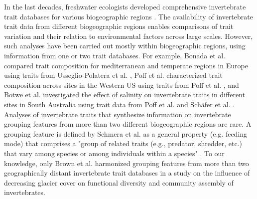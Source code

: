 \documentclass{article}
\begin{document}
In the last decades, freshwater ecologists developed comprehensive invertebrate trait databases for various biogeographic regions \cite{usseglio-polatera_biomonitoring_2000, schmidt-kloiber_www.freshwaterecology.info_2015, vieira_database_nodate, Philips_and_Smith_NZ_DB_2018, kefford_integrated_2020, tomanova_trophic_2006}. The availability of invertebrate trait data from different biogeographic regions enables comparisons of trait variation and their relation to environmental factors across large scales. However, such analyses have been carried out mostly within biogeographic regions, using information from one or two trait databases. For example, Bonada et al. \cite{bonada_taxonomic_2007} compared trait composition for mediterranean and temperate regions in Europe using traits from Usseglio-Polatera et al. \cite{usseglio-polatera_biomonitoring_2000}, Poff et al. \cite{poff_developing_2010} characterized trait composition across sites in the Western US using traits from Poff et al. \cite{poff_functional_2006}, and Botwe et al. \cite{botwe_effects_2018} investigated the effect of salinity on invertebrate traits in different sites in South Australia using trait data from Poff et al. \cite{poff_functional_2006} and Schäfer et al. \cite{schafer_trait_2011}. 
Analyses of invertebrate traits that synthesize information on invertebrate grouping features from more than two different biogeographic regions are rare. A grouping feature is defined by Schmera et al. as a general property (e.g. feeding mode) that comprises a "group of related traits (e.g., predator, shredder, etc.) that vary among species or among individuals within a species" \cite{schmera_proposed_2015}. To our knowledge, only Brown et al. \cite{brown_functional_2018} harmonized grouping features from more than two geographically distant invertebrate trait databases in a study on the influence of decreasing glacier cover on functional diversity and community assembly of invertebrates. 
\end{document}
